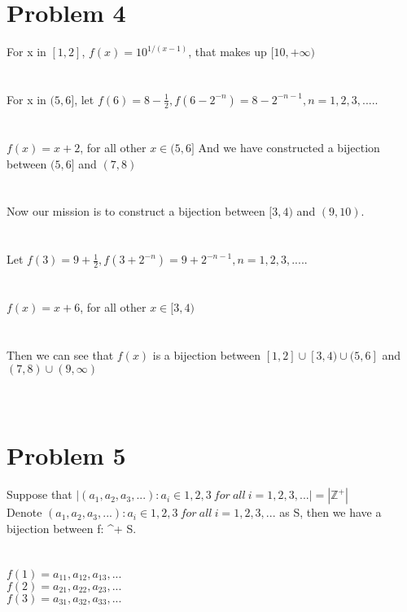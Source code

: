 \documentclass{article}
\begin{document}
\section{Problem 4}
For x in $[1,2]$, $f(x) = 10^{1/(x-1)}$, that makes up $[10,+ \infty)$\\
\\ \hspace*{\fill} \\
For x in $(5,6]$, let $f(6) = 8 - \frac{1}{2}, f(6 - 2^{-n}) = 8 - 2^{-n-1}, n = 1, 2, 3, .....$\\
\\ \hspace*{\fill} \\
$f(x) = x + 2$, for all other $x \in (5, 6]$ And we have constructed a bijection between $(5,6]$ and $(7,8)$\\
\\ \hspace*{\fill} \\
Now our mission is to construct a bijection between $[3,4)$ and $(9,10)$.\\
\\ \hspace*{\fill} \\
Let $f(3) = 9 + \frac{1}{2}, f(3 + 2^{-n}) = 9 + 2^{-n-1}, n = 1, 2, 3, .....$\\
\\ \hspace*{\fill} \\
$f(x) = x + 6$, for all other $x \in [3, 4)$\\
\\ \hspace*{\fill} \\
Then we can see that $f(x)$ is a bijection between $[1,2] \cup [3,4) \cup (5,6]$ and $(7,8) \cup (9,\infty)$\\
\\ \hspace*{\fill} \\
\newpage
\section{Problem 5}
Suppose that $|{(a_1, a_2, a_3, . . .) : a_i \in {1, 2, 3}\ for\ all\ i = 1, 2, 3, . . .}| = |\mathbb{Z}^+|$\\
Denote ${(a_1, a_2, a_3, . . .) : a_i \in {1, 2, 3}\ for\ all\ i = 1, 2, 3, . . .}$ as S, then we have a bijection between f: ^+ \rightarrow S.\\
\\ \hspace*{\fill} \\
$f(1) = {a_{11}, a_{12}, a_{13}, . . .}$\\
$f(2) = {a_{21}, a_{22}, a_{23}, . . .}$\\
$f(3) = {a_{31}, a_{32}, a_{33}, . . .}$\\
\end{document}
